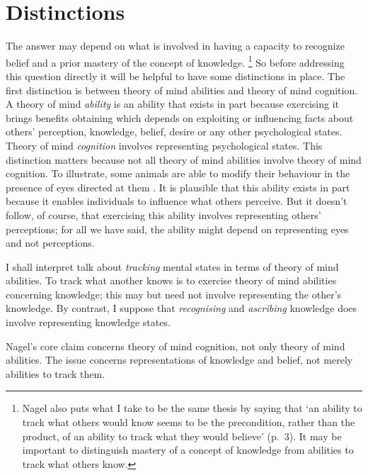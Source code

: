 \documentclass[11pt,a4paper]{extarticle}
\begin{document}
 
 

\section{Distinctions}

The answer may depend on what is involved in having a capacity  to recognize belief and a prior mastery of the concept of knowledge.%
\footnote{
Nagel also puts what I take to be the same thesis by saying that `an ability to track what others would know seems to be the precondition, rather than the product, of an ability to track what they would believe' (p.\ 3).
It may be important to distinguish mastery of a concept of knowledge from abilities to track what others know.
}
So before addressing this question directly it will be helpful to have some distinctions in place.
The first distinction is between theory of mind abilities and theory of mind cognition.
A theory of mind \textit{ability} is an ability that exists in part because exercising it brings benefits obtaining which depends on exploiting or influencing facts about others’ perception, knowledge, belief, desire or any other psychological states.  
Theory of mind \textit{cognition}  involves representing psychological states.
This distinction matters because not all theory of mind abilities involve theory of mind cognition.
To illustrate, some animals are able to modify their behaviour  in the presence of eyes directed at them \citep[e.g.][]{ernest-jones_effects_2011}.
It is plausible that this ability exists in part because it enables individuals to influence what others perceive.
But it doesn't follow, of course, that exercising this ability involves representing others' perceptions; for all we have said, the ability might depend on representing eyes and not perceptions.  



I shall interpret talk about \textit{tracking} mental states in terms of theory of mind abilities.
To track what another knows is to exercise theory of mind abilities concerning knowledge; this may but need not involve representing the other's knowledge.
By contrast, I suppose that \textit{recognising} and \textit{ascribing} knowledge does involve representing knowledge states.




Nagel's core claim concerns theory of mind cognition, not only theory of mind abilities. 
The issue concerns representations of knowledge and belief, not merely abilities to track them.%
\end{document}
